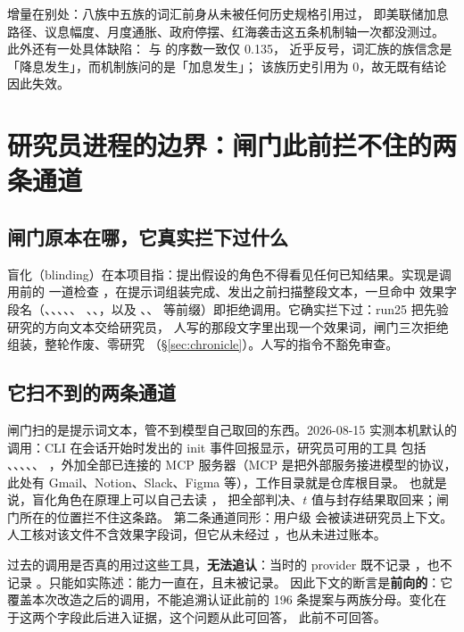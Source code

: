 \documentclass[11pt]{ctexart}
\begin{document}
增量在别处：八族中五族的词汇前身从未被任何历史规格引用过，
即美联储加息路径、议息幅度、月度通胀、政府停摆、红海袭击这五条机制轴一次都没测过。
此外还有一处具体缺陷： 与  的序数一致仅 0.135，
近乎反号，词汇族的族信念是「降息发生」，而机制族问的是「加息发生」；
该族历史引用为 0，故无既有结论因此失效。

\section{研究员进程的边界：闸门此前拦不住的两条通道}\label{sec:hermetic}
\subsection{闸门原本在哪，它真实拦下过什么}
盲化（blinding）在本项目指：提出假设的角色不得看见任何已知结果。实现是调用前的
一道检查 ，在提示词组装完成、发出之前扫描整段文本，一旦命中
效果字段名（、、、、、
、、，以及 、、
 等前缀）即拒绝调用。它确实拦下过：run25 把先验研究的方向文本交给研究员，
人写的那段文字里出现一个效果词，闸门三次拒绝组装，整轮作废、零研究
（\S\ref{sec:chronicle}）。人写的指令不豁免审查。

\subsection{它扫不到的两条通道}
闸门扫的是提示词文本，管不到模型自己取回的东西。2026-08-15 实测本机默认的
 调用：CLI 在会话开始时发出的 init 事件回报显示，研究员可用的工具
包括 、、、、、
，外加全部已连接的 MCP 服务器（MCP 是把外部服务接进模型的协议，
此处有 Gmail、Notion、Slack、Figma 等），工作目录就是仓库根目录。
也就是说，盲化角色在原理上可以自己去读 ，
把全部判决、$t$ 值与封存结果取回来；闸门所在的位置拦不住这条路。
第二条通道同形：用户级  会被读进研究员上下文。
人工核对该文件不含效果字段词，但它从未经过 ，也从未进过账本。

过去的调用是否真的用过这些工具，\textbf{无法追认}：当时的 provider 既不记录
，也不记录 。只能如实陈述：能力一直在，且未被记录。
因此下文的断言是\textbf{前向的}：它覆盖本次改造之后的调用，不能追溯认证此前的
196 条提案与两族分母。变化在于这两个字段此后进入证据，这个问题从此可回答，
此前不可回答。
\end{document}

